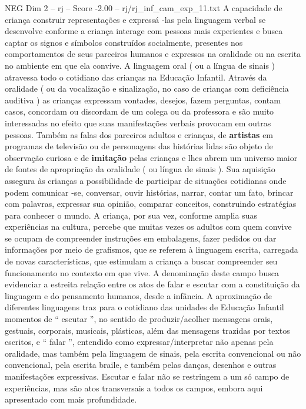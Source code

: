 \begin{textsample}{NEG Dim 2 – rj – Score -2.00 – rj/rj\_inf\_cam\_exp\_11.txt}  \label{ex:f2_neg_051}
A capacidade de criança construir representações e expressá -las pela linguagem verbal se desenvolve conforme a criança interage com pessoas mais experientes e busca captar os signos e símbolos construídos socialmente, presentes nos comportamentos de seus parceiros humanos e expressos na oralidade ou na escrita no ambiente em que ela convive.
A linguagem oral ( ou a língua de sinais ) atravessa todo o cotidiano das crianças na Educação Infantil.
Através da oralidade ( ou da vocalização e sinalização, no caso de crianças com deficiência auditiva ) as crianças expressam vontades, desejos, fazem perguntas, contam casos, concordam ou discordam de um colega ou da professora e são muito interessadas no efeito que suas manifestações verbais provocam em outras pessoas.
Também as falas dos parceiros adultos e crianças, de \textbf{artistas} em programas de televisão ou de personagens das histórias lidas são objeto de observação curiosa e de \textbf{imitação} pelas crianças e lhes abrem um universo maior de fontes de apropriação da oralidade ( ou língua de sinais ).
Sua aquisição assegura às crianças a possibilidade de participar de situações cotidianas onde podem comunicar -se, conversar, ouvir histórias, narrar, contar um fato, brincar com palavras, expressar sua opinião, comparar conceitos, construindo estratégias para conhecer o mundo.
A criança, por sua vez, conforme amplia suas experiências na cultura, percebe que muitas vezes os adultos com quem convive se ocupam de compreender instruções em embalagens, fazer pedidos ou dar informações por meio de grafismos, que se referem à linguagem escrita, carregada de novas características, que estimulam a criança a buscar compreender seu funcionamento no contexto em que vive.
A denominação deste campo busca evidenciar a estreita relação entre os atos de falar e escutar com a constituição da linguagem e do pensamento humanos, desde a infância.
A aproximação de diferentes linguagens traz para o cotidiano das unidades de Educação Infantil momentos de “ escutar ”, no sentido de produzir/acolher mensagens orais, gestuais, corporais, musicais, plásticas, além das mensagens trazidas por textos escritos, e “ falar ”, entendido como expressar/interpretar não apenas pela oralidade, mas também pela linguagem de sinais, pela escrita convencional ou não convencional, pela escrita braile, e também pelas danças, desenhos e outras manifestações expressivas.
Escutar e falar não se restringem a um só campo de experiências, mas são atos transversais a todos os campos, embora aqui apresentado com mais profundidade.

\end{textsample}
